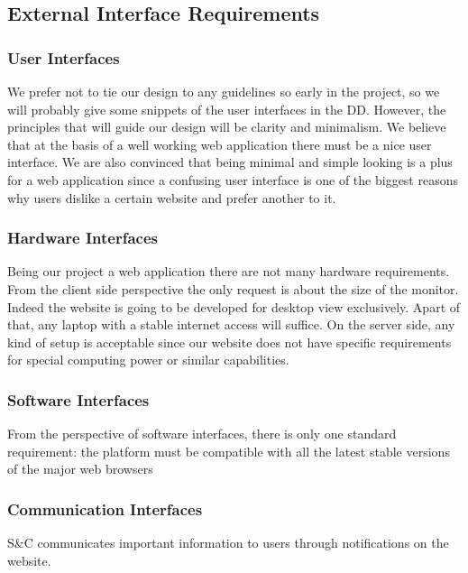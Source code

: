 
\subsection{External Interface Requirements}
    \subsubsection{User Interfaces}
    We prefer not to tie our design to any guidelines so early in the project, so we will probably give some snippets of the user interfaces in the DD. However, the principles that will guide our design will be clarity and minimalism. We believe that at the basis of a well working web application there must be a nice user interface. We are also convinced that being minimal and simple looking is a plus for a web application since a confusing user interface is one of the biggest reasons why users dislike a certain website and prefer another to it.

    \subsubsection{Hardware Interfaces}
    Being our project a web application there are not many hardware requirements. From the client side perspective the only request is about the size of the monitor. Indeed the website is going to be developed for desktop view exclusively. Apart of that, any laptop with a stable internet access will suffice. On the server side, any kind of setup is acceptable since our website does not have specific requirements for special computing power or similar capabilities.

    \subsubsection{Software Interfaces}
    From the perspective of software interfaces, there is only one standard requirement: the platform must be compatible with all the latest stable versions of the major web browsers
    
    \subsubsection{Communication Interfaces}
    S\&C communicates important information to users through notifications on the website.
    
